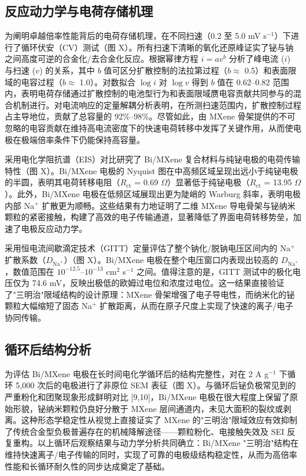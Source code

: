 \subsection{反应动力学与电荷存储机理}

为阐明卓越倍率性能背后的电荷存储机理，在不同扫速（0.2 至 5.0 mV s$^{-1}$）下进行了循环伏安（CV）测试（图 X）。所有扫速下清晰的氧化还原峰证实了铋与钠之间高度可逆的合金化/去合金化反应。根据幂律方程 $i = av^{b}$ 分析了峰电流 ($i$) 与扫速 ($v$) 的关系，其中 $b$ 值可区分扩散控制的法拉第过程（$b \approx$ 0.5）和表面限域的电容过程（$b \approx$ 1.0）。对数拟合 $\log i$ 对 $\log v$ 得到 $b$ 值在 0.62--0.82 范围内，表明电荷存储通过扩散控制的电池型行为和表面限域赝电容贡献共同参与的混合机制进行。对电流响应的定量解耦分析表明，在所测扫速范围内，扩散控制过程占主导地位，贡献了总容量的 92\%--98\%。尽管如此，由 MXene 骨架提供的不可忽略的电容贡献在维持高电流密度下的快速电荷转移中发挥了关键作用，从而使电极在极端倍率条件下仍能保持高容量。

采用电化学阻抗谱（EIS）对比研究了 Bi/MXene 复合材料与纯铋电极的电荷传输特性（图 X）。Bi/MXene 电极的 Nyquist 图在中高频区域呈现出远小于纯铋电极的半圆，表明其电荷转移电阻（$R_{\text{ct}}$ = 0.69 $\Omega$）显著低于纯铋电极（$R_{\text{ct}}$ = 13.95 $\Omega$）。此外，Bi/MXene 电极在低频区域展现出更为陡峭的 Warburg 斜率，表明电极内部 Na$^{+}$ 扩散更为顺畅。这些结果有力地证明了二维 MXene 导电骨架与铋纳米颗粒的紧密接触，构建了高效的电子传输通道，显著降低了界面电荷转移势垒，加速了电极反应动力学。

采用恒电流间歇滴定技术（GITT）定量评估了整个钠化/脱钠电压区间内的 Na$^{+}$ 扩散系数（$D_{\text{Na}^{+}}$）（图 X）。Bi/MXene 电极在整个电压窗口内表现出较高的 $D_{\text{Na}^{+}}$，数值范围在 $10^{-12.5}$--$10^{-13}$ cm$^{2}$ s$^{-1}$ 之间。值得注意的是，GITT 测试中的极化电压仅为 74.6 mV，反映出极低的欧姆过电位和浓度过电位。这一结果直接验证了"三明治"限域结构的设计原理：MXene 骨架增强了电子导电性，而纳米化的铋颗粒大幅缩短了固态 Na$^{+}$ 扩散距离，从而在原子尺度上实现了快速的离子/电子协同传输。

\subsection{循环后结构分析}

为评估 Bi/MXene 电极在长时间电化学循环后的结构完整性，对在 2 A g$^{-1}$ 下循环 5,000 次后的电极进行了非原位 SEM 表征（图 X）。与循环后铋负极常见到的严重粉化和团聚现象形成鲜明对比 [9,10]，Bi/MXene 电极在很大程度上保留了原始形貌，铋纳米颗粒仍良好分散于 MXene 层间通道内，未见大面积的裂纹或剥离。这种形态学稳定性从视觉上直接证实了 MXene 的"三明治"限域效应有效抑制了传统合金型负极普遍存在的机械降解途径——颗粒粉化、电接触失效及 SEI 反复重构。以上循环后观察结果与动力学分析共同确立：Bi/MXene "三明治"结构在维持快速离子/电子传输的同时，实现了可靠的电极级结构稳定性，从而为高倍率性能和长循环耐久性的同步达成奠定了基础。

